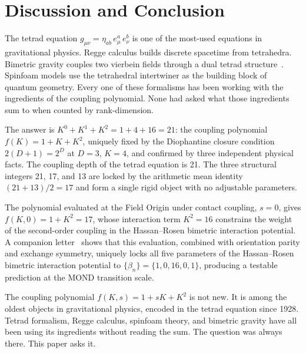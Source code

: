 \documentclass[a4paper,11pt]{article}
\begin{document}
\section{Discussion and Conclusion}

The tetrad equation $g_{\mu\nu} = \eta_{ab}\,e^a_\mu\,e^b_\nu$
is one of the most-used equations in gravitational physics.
Regge calculus builds discrete spacetime from tetrahedra.
Bimetric gravity couples two vierbein fields through a dual
tetrad structure~\cite{Alexandrov2013}. Spinfoam models use
the tetrahedral intertwiner as the building block of quantum
geometry. Every one of these formalisms has been working with
the ingredients of the coupling polynomial. None had asked
what those ingredients sum to when counted by rank-dimension.

The answer is $K^0 + K^1 + K^2 = 1 + 4 + 16 = 21$: the
coupling polynomial $f(K) = 1 + K + K^2$, uniquely fixed
by the Diophantine closure condition $2(D+1) = 2^D$ at
$D = 3$, $K = 4$, and confirmed by three independent
physical facts. The coupling
depth of the tetrad equation is 21. The three
structural integers 21, 17, and 13 are locked by the
arithmetic mean identity $(21 + 13)/2 = 17$ and form a
single rigid object with no adjustable parameters.

The polynomial evaluated at the Field Origin under contact
coupling, $s = 0$, gives $f(K,0) = 1 + K^2 = 17$, whose
interaction term $K^2 = 16$ constrains the weight of the
second-order coupling in the Hassan--Rosen bimetric
interaction potential. A companion letter~\cite{Nelson2026b}
shows that this evaluation, combined with orientation parity
and exchange symmetry, uniquely locks all five parameters
of the Hassan--Rosen bimetric interaction potential to
$\{\beta_n\} = \{1, 0, 16, 0, 1\}$, producing a testable
prediction at the MOND transition scale.

The coupling polynomial $f(K,s) = 1 + sK + K^2$ is not
new. It is among the oldest objects in gravitational
physics, encoded in the tetrad equation since 1928.
Tetrad formalism, Regge calculus, spinfoam theory, and
bimetric gravity have all been using its ingredients
without reading the sum. The question was always there.
This paper asks it.


\acknowledgments
\end{document}
